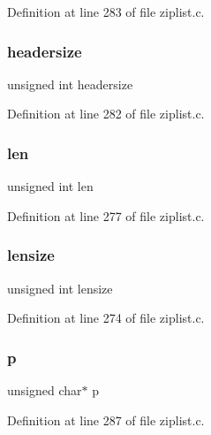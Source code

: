 Definition at line 283 of file ziplist.\+c.

\mbox{\label{structzlentry_a96f65a94d882ba054e92cc2c9300707c}} 
\subsubsection{\texorpdfstring{headersize}{headersize}}
{\footnotesize\ttfamily unsigned int headersize}



Definition at line 282 of file ziplist.\+c.

\mbox{\label{structzlentry_a77124bd5f7e31e6fffc19f335da0c23f}} 
\subsubsection{\texorpdfstring{len}{len}}
{\footnotesize\ttfamily unsigned int len}



Definition at line 277 of file ziplist.\+c.

\mbox{\label{structzlentry_ab779bf43e60fb94a44b8f80cc8b46860}} 
\subsubsection{\texorpdfstring{lensize}{lensize}}
{\footnotesize\ttfamily unsigned int lensize}



Definition at line 274 of file ziplist.\+c.

\mbox{\label{structzlentry_a4014c6f4a6fa0e565ca592bcaca0fa58}} 
\subsubsection{\texorpdfstring{p}{p}}
{\footnotesize\ttfamily unsigned char$\ast$ p}



Definition at line 287 of file ziplist.\+c.

\mbox{\label{structzlentry_a1490cc0156cd544c2b683b7394006b8a}} 
